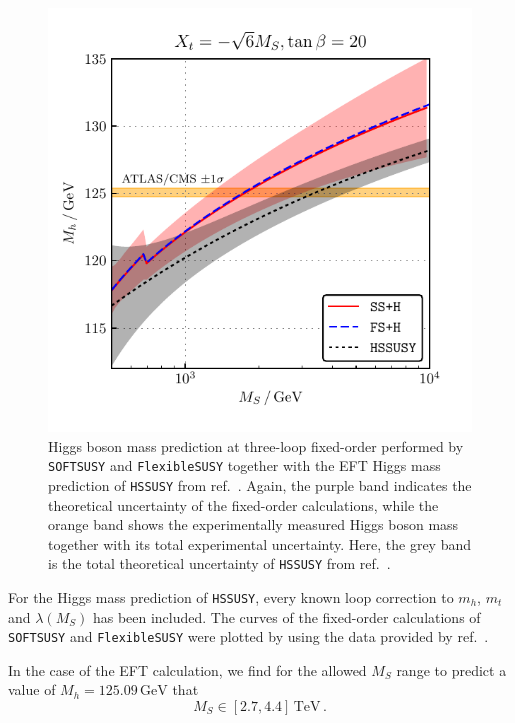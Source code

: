 \documentclass[a4paper,12pt]{book}
\begin{document}
\begin{figure}[!h]
\begin{minipage}[t]{0.5\textwidth}
\includegraphics[width=\textwidth]{src/img/DMh_MS_combined_old.pdf}
\caption{Higgs boson mass prediction at three-loop fixed-order performed by \texttt{SOFTSUSY} and \texttt{FlexibleSUSY} together with the EFT Higgs mass prediction of \texttt{HSSUSY} from ref.\ \cite{allanachvoigt}. Again, the purple band indicates the theoretical uncertainty of the fixed-order calculations, while the orange band shows the experimentally measured Higgs boson mass together with its total experimental uncertainty. Here, the grey band is the total theoretical uncertainty of \texttt{HSSUSY} from ref.\ \cite{allanachvoigt}.}
\label{fig::DMh_combined_old}
\end{minipage}
\end{figure}\par
For the Higgs mass prediction of \texttt{HSSUSY}, every known loop correction to $m_h$, $m_t$ and $\lambda(M_S)$ has been included. The curves of the fixed-order calculations of \texttt{SOFTSUSY} and \texttt{FlexibleSUSY} were plotted by using the data provided by ref.\ \cite{allanachvoigt}.\par 
In the case of the EFT calculation, we find for the allowed $M_S$ range to predict a value of $M_h = 125.09\,\mathrm{GeV}$ that 
\begin{equation}
M_S \in [2.7,4.4]\,\mathrm{TeV}\,.
\end{equation}
\end{document}
